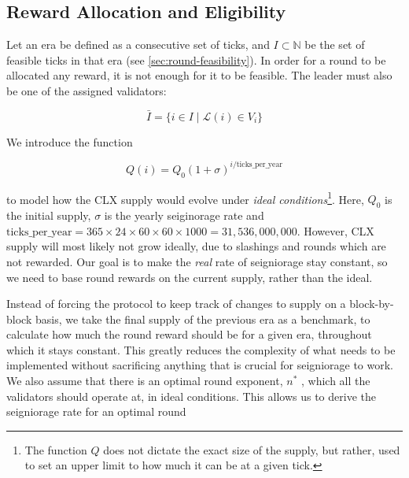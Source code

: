 
\subsection{Reward Allocation and Eligibility}
\label{sec:reward-allocation-eligibility}

Let an era be defined as a consecutive set of ticks, and $I\subset\mathbb{N}$ be the set of feasible ticks in that era (see \ref{sec:round-feasibility}). In order for a round to be allocated any reward, it is not enough for it to be feasible. The leader must also be one of the assigned validators:

\begin{equation}
\bar{I}=\{i\in I \mid \mathcal{L}(i) \in V_i\}
\end{equation}

We introduce the function

\begin{equation}
Q(i) = Q_0 (1+\sigma)^{i/\text{ticks\_per\_year}}
\end{equation}

to model how the CLX supply would evolve under \emph{ideal conditions}\footnote{The function $Q$ does not dictate the exact size of the supply, but rather, used to set an upper limit to how much it can be at a given tick.}. Here, $Q_0$ is the initial supply, $\sigma$ is the yearly seiginorage rate and $\text{ticks\_per\_year} = 365\times 24\times 60 \times 60 \times 1000 = 31,\!536,\!000,\!000$. However, CLX supply will most likely not grow ideally, due to slashings and rounds which are not rewarded. Our goal is to make the \emph{real} rate of seigniorage stay constant, so we need to base round rewards on the current supply, rather than the ideal.

Instead of forcing the protocol to keep track of changes to supply on a block-by-block basis, we take the final supply of the previous era as a benchmark, to calculate how much the round reward should be for a given era, throughout which it stays constant. This greatly reduces the complexity of what needs to be implemented without sacrificing anything that is crucial for seigniorage to work. We also assume that there is an optimal round exponent, $n^\ast$ , which all the validators should operate at, in ideal conditions. This allows us to derive the seigniorage rate for an optimal round

